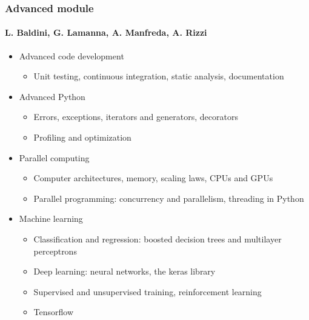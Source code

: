 \documentclass[9pt]{beamer}
\begin{document}
\begin{frame}
  \frametitle{Advanced module}
  \framesubtitle{L. Baldini, G. Lamanna, A. Manfreda, A. Rizzi}
  \begin{itemize}
  \item Advanced code development
    \begin{itemize}
    \item Unit testing, continuous integration, static analysis, documentation
    \end{itemize}
  \item Advanced Python
    \begin{itemize}
    \item Errors, exceptions, iterators and generators, decorators
    \item Profiling and optimization
    \end{itemize}
  \item Parallel computing
    \begin{itemize}
    \item Computer architectures, memory, scaling laws, CPUs and GPUs
    \item Parallel programming: concurrency and parallelism, threading in Python
    \end{itemize}
  \item Machine learning
    \begin{itemize}
    \item Classification and regression: boosted decision trees and
      multilayer perceptrons
    \item Deep learning: neural networks, the keras library
    \item Supervised and unsupervised training, reinforcement learning
    \item Tensorflow
    \end{itemize}
  \end{itemize}
\end{frame}
\end{document}
